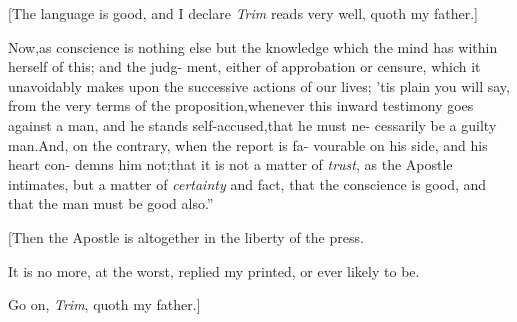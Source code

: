 \documentclass{article}
\begin{document}
[The language is good, and I declare \textit{Trim} reads very
well, quoth my father.]

\lqq Now,\tsk as conscience is nothing else\break
\lqq but the knowledge which the mind has\break
\lqq within herself of this; and the judg-\break
\lqq ment, either of approbation or censure,\break
\lqq which it unavoidably makes upon the\break
\lqq successive actions of our lives; ’tis plain\break
\lqq you will say, from the very terms of\break
\lqq the proposition,\tsk whenever this inward\break
\lqq testimony goes against a man, and he\break
\lqq stands self-accused,\tsk that he must ne-\break
\lqq cessarily be a guilty man.\tsk And, on\break
\lqq the contrary, when the report is fa-\break
\lqq vourable on his side, and his heart con-
\lqq demns him not;\tsh that it is not a\break
\lqq matter of \textit{trust}, as the Apostle intimates,\break
\lqq \tsk but a matter of \textit{certainty} and fact,\break
\lqq that the conscience is good, and that\break
\lqq the man must be good also.”

[Then the Apostle is altogether in the 
liberty of the press.

It is no more, at the worst, replied my
printed, or ever likely to be.

Go on, \textit{Trim}, quoth my father.]
\end{document}
